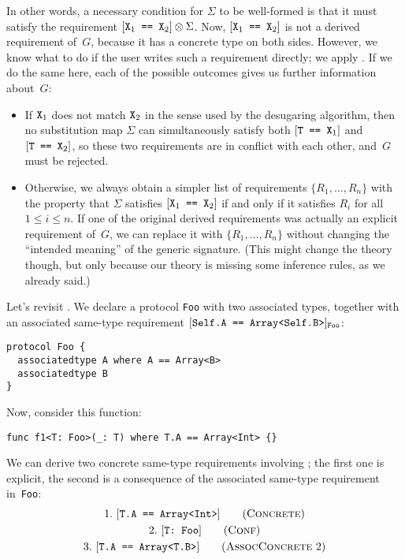 \documentclass[../generics]{subfiles}
\begin{document}
In other words, a necessary condition for $\Sigma$ to be well-formed is that it must satisfy the requirement $[\texttt{$\texttt{X}_1$ == $\texttt{X}_2$}]\otimes\Sigma$. Now, $[\texttt{$\texttt{X}_1$ == $\texttt{X}_2$}]$ is not a derived requirement of~$G$, because it has a concrete type on both sides. However, we know what to do if the user writes such a requirement directly; we apply . If we do the same here, each of the possible outcomes gives us further information about~$G$:
\begin{itemize}
\item If $\texttt{X}_1$ does not match $\texttt{X}_2$ in the sense used by the desugaring algorithm, then no substitution map $\Sigma$ can simultaneously satisfy both $[\texttt{T == $\texttt{X}_1$}]$ and $[\texttt{T == $\texttt{X}_2$}]$, so these two requirements are in conflict with each other, and~$G$ must be rejected.

\item Otherwise, we always obtain a simpler list of requirements $\{R_1,\ldots,R_n\}$ with the property that $\Sigma$ satisfies $[\texttt{$\texttt{X}_1$ == $\texttt{X}_2$}]$ if and only if it satisfies $R_i$ for all $1\le i\le n$. If one of the original derived requirements was actually an explicit requirement of~$G$, we can replace it with $\{R_1,\ldots,R_n\}$ without changing the ``intended meaning'' of the generic signature. (This might change the theory though, but only because our theory is missing some inference rules, as we already said.)
\end{itemize}
Let's revisit . We declare a protocol \texttt{Foo} with two associated types, together with an associated same-type requirement $[\texttt{Self.A == Array<Self.B>}]_{\texttt{Foo}}$:
\begin{Verbatim}
protocol Foo {
  associatedtype A where A == Array<B>
  associatedtype B
}
\end{Verbatim}
Now, consider this function:
\begin{Verbatim}
func f1<T: Foo>(_: T) where T.A == Array<Int> {}
\end{Verbatim}
We can derive two concrete same-type requirements involving \tT; the first one is explicit, the second is a consequence of the associated same-type requirement in~\texttt{Foo}:
\begin{gather*}
\ConcreteStep{T.A}{Array<Int>}{1}\\
\ConfStep{T}{Foo}{2}\\
\AssocConcreteStep{2}{T.A}{Array<T.B>}{3}
\end{gather*}
\end{document}
